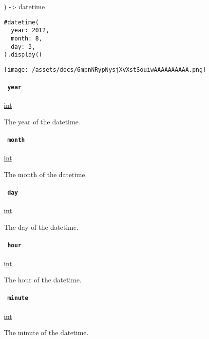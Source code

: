) -\textgreater{} \href{/docs/reference/foundations/datetime/}{datetime}

\begin{verbatim}
#datetime(
  year: 2012,
  month: 8,
  day: 3,
).display()
\end{verbatim}

\texttt{[image: /assets/docs/6mpnNRypNysjXvXstSouiwAAAAAAAAAA.png]}

\paragraph{\texorpdfstring{\texttt{\ year\ }}{ year }}\label{constructor-year}

\href{/docs/reference/foundations/int/}{int}

The year of the datetime.

\paragraph{\texorpdfstring{\texttt{\ month\ }}{ month }}\label{constructor-month}

\href{/docs/reference/foundations/int/}{int}

The month of the datetime.

\paragraph{\texorpdfstring{\texttt{\ day\ }}{ day }}\label{constructor-day}

\href{/docs/reference/foundations/int/}{int}

The day of the datetime.

\paragraph{\texorpdfstring{\texttt{\ hour\ }}{ hour }}\label{constructor-hour}

\href{/docs/reference/foundations/int/}{int}

The hour of the datetime.

\paragraph{\texorpdfstring{\texttt{\ minute\ }}{ minute }}\label{constructor-minute}

\href{/docs/reference/foundations/int/}{int}

The minute of the datetime.

